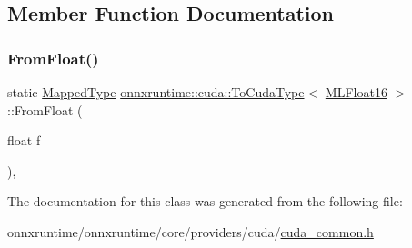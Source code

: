 \subsection{Member Function Documentation}
\mbox{\label{classonnxruntime_1_1cuda_1_1ToCudaType_3_01MLFloat16_01_4_a4dd3696c2b50dcac6f48065bd45e9acf}} 
\subsubsection{\texorpdfstring{From\+Float()}{FromFloat()}}
{\footnotesize\ttfamily static \mbox{\hyperlink{classonnxruntime_1_1cuda_1_1ToCudaType_3_01MLFloat16_01_4_a1c4be6f7df08b7f2f2f7d2ccb18cde81}{Mapped\+Type}} \mbox{\hyperlink{classonnxruntime_1_1cuda_1_1ToCudaType}{onnxruntime\+::cuda\+::\+To\+Cuda\+Type}}$<$ \mbox{\hyperlink{uniononnxruntime_1_1MLFloat16}{M\+L\+Float16}} $>$\+::From\+Float (\begin{DoxyParamCaption}\item[{float}]{f }\end{DoxyParamCaption})\hspace{0.3cm}{\ttfamily [inline]}, {\ttfamily [static]}}



The documentation for this class was generated from the following file\+:\begin{DoxyCompactItemize}
\item 
onnxruntime/onnxruntime/core/providers/cuda/\mbox{\hyperlink{cuda__common_8h}{cuda\+\_\+common.\+h}}\end{DoxyCompactItemize}
